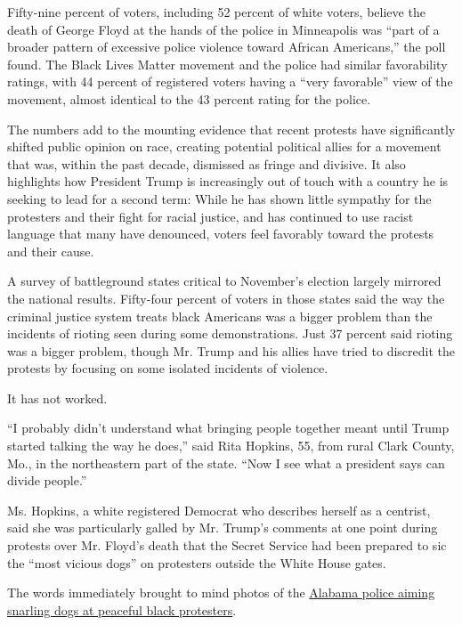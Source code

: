Fifty-nine percent of voters, including 52 percent of white voters,
believe the death of George Floyd at the hands of the police in
Minneapolis was ``part of a broader pattern of excessive police violence
toward African Americans,'' the poll found. The Black Lives Matter
movement and the police had similar favorability ratings, with 44
percent of registered voters having a ``very favorable'' view of the
movement, almost identical to the 43 percent rating for the police.

The numbers add to the mounting evidence that recent protests have
significantly shifted public opinion on race, creating potential
political allies for a movement that was, within the past decade,
dismissed as fringe and divisive. It also highlights how President Trump
is increasingly out of touch with a country he is seeking to lead for a
second term: While he has shown little sympathy for the protesters and
their fight for racial justice, and has continued to use racist language
that many have denounced, voters feel favorably toward the protests and
their cause.

A survey of battleground states critical to November's election largely
mirrored the national results. Fifty-four percent of voters in those
states said the way the criminal justice system treats black Americans
was a bigger problem than the incidents of rioting seen during some
demonstrations. Just 37 percent said rioting was a bigger problem,
though Mr. Trump and his allies have tried to discredit the protests by
focusing on some isolated incidents of violence.

It has not worked.

``I probably didn't understand what bringing people together meant until
Trump started talking the way he does,'' said Rita Hopkins, 55, from
rural Clark County, Mo., in the northeastern part of the state. ``Now I
see what a president says can divide people.''

Ms. Hopkins, a white registered Democrat who describes herself as a
centrist, said she was particularly galled by Mr. Trump's comments at
one point during protests over Mr. Floyd's death that the Secret Service
had been prepared to sic the ``most vicious dogs'' on protesters outside
the White House gates.

The words immediately brought to mind photos of the
\href{https://www.washingtonpost.com/history/2020/06/01/trump-vicious-dogs-protesters-civil-rights-slavery/}{Alabama
police aiming snarling dogs at peaceful black protesters}.


